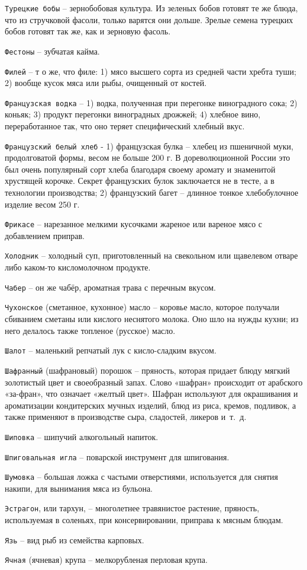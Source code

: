 {\tt Турецкие бобы} – зернобобовая культура. Из зеленых бобов готовят те же блюда, что из стручковой фасоли, только варятся они дольше. Зрелые семена турецких бобов готовят так же, как и зерновую фасоль.

{\tt Фестоны} – зубчатая кайма. 

{\tt Филей} – т о же, что филе: 1) мясо высшего сорта из средней части хребта туши; 2) вообще кусок мяса или рыбы, очищенный от костей.

{\tt Французская водка} – 1) водка, полученная при перегонке виноградного сока; 2) коньяк; 3) продукт перегонки виноградных дрожжей; 4) хлебное вино, переработанное так, что оно теряет специфический хлебный вкус.

{\tt Французский белый хлеб} - 1) французская булка – хлебец из пшеничной муки, продолговатой формы, весом не больше 200 г. В дореволюционной России это был очень популярный сорт хлеба благодаря своему аромату и знаменитой хрустящей корочке. Секрет французских булок заключается не в тесте, а в технологии производства; 2) французский багет – длинное тонкое хлебобулочное изделие весом 250 г.

{\tt Фрикасе} – нарезанное мелкими кусочками жареное или вареное мясо с добавлением приправ.

{\tt Холодник} – холодный суп, приготовленный на свекольном или щавелевом отваре либо каком-то кисломолочном продукте.

{\tt Чабер} – он же чабёр, ароматная трава с перечным вкусом.

{\tt Чухонское} (сметанное, кухонное) масло – коровье масло, которое получали сбиванием сметаны или кислого неснятого молока. Оно шло на нужды кухни; из него делалось также топленое (русское) масло.

{\tt Шалот} – маленький репчатый лук с кисло-сладким вкусом.

{\tt Шафранный} (шафрановый) порошок – пряность, которая придает блюду мягкий золотистый цвет и своеобразный запах. Слово «шафран» происходит от арабского «за-фран», что означает «желтый цвет». Шафран используют для окрашивания и ароматизации кондитерских мучных изделий, блюд из риса, кремов, подливок, а также применяют в производстве сыра, сладостей, ликеров и~т.~д.

{\tt Шиповка} – шипучий алкогольный напиток.

{\tt Шпиговальная игла} – поварской инструмент для шпигования.

{\tt Шумовка} – большая ложка с частыми отверстиями, используется для снятия накипи, для вынимания мяса из бульона.

{\tt Эстрагон}, или тархун, – многолетнее травянистое растение, пряность, используемая в соленьях, при консервировании, приправа к мясным блюдам.

{\tt Язь} – вид рыб из семейства карповых.

{\tt Ячная} (ячневая) крупа – мелкорубленая перловая крупа.